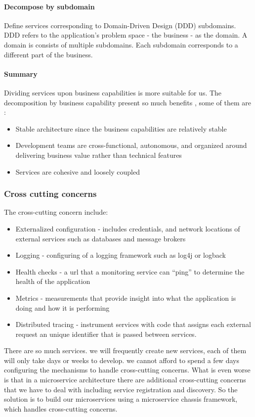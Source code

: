 \paragraph{Decompose by subdomain}
\label{sec:sec01}
Define services corresponding to Domain-Driven Design (DDD) subdomains. 
DDD refers to the application's problem space - the business - as the domain.
 A domain is consists of multiple subdomains. 
 Each subdomain corresponds to a different part of the business.

\paragraph{Summary}
\label{sec:sec01}
Dividing services upon business capabilities is more suitable for us.
The decomposition by business capability present so much benefits , some of them are :
\begin{itemize}
  \item Stable architecture since the business capabilities are relatively stable
  \item Development teams are cross-functional, autonomous, and organized around delivering business value rather than technical features
  \item Services are cohesive and loosely coupled
\end{itemize}

\subsubsection{Cross cutting concerns}
\label{sec:sec01}
The cross-cutting concern include:
\begin{itemize}
  \item Externalized configuration - includes credentials, and network locations of external services such as databases and message brokers
  \item Logging - configuring of a logging framework such as log4j or logback
  \item Health checks - a url that a monitoring service can “ping” to determine the health of the application
  \item Metrics - measurements that provide insight into what the application is doing and how it is performing
  \item Distributed tracing - instrument services with code that assigns each external request an unique identifier that is passed between services.
\end{itemize}
 There are so much services. we will frequently create new services, each of them will only take days or 
 weeks to develop. we cannot afford to spend a few days configuring the mechanisms to handle cross-cutting concerns. 
 What is even worse is that in a microservice architecture there are additional cross-cutting concerns 
 that we have to deal with including service registration and discovery.
 So the solution is to build our microservices using a microservice chassis framework, 
 which handles cross-cutting concerns.
